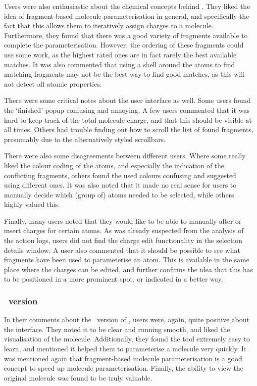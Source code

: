 Users were also enthusiastic about the chemical concepts behind \oframp. They liked the idea of fragment-based molecule parameterisation in general, and specifically the fact that this allows them to iteratively assign charges to a molecule. Furthermore, they found that there was a good variety of fragments available to complete the parameterisation. However, the ordering of these fragments could use some work, as the highest rated ones are in fact rarely the best available matches. It was also commented that using a shell around the atoms to find matching fragments may not be the best way to find good matches, as this will not detect all atomic properties.

There were some critical notes about the user interface as well. Some users found the `finished' popup confusing and annoying. A few users commented that it was hard to keep track of the total molecule charge, and that this should be visible at all times. Others had trouble finding out how to scroll the list of found fragments, presumably due to the alternatively styled scrollbars.

There were also some disagreements between different users. Where some really liked the colour coding of the atoms, and especially the indication of the conflicting fragments, others found the used colours confusing and suggested using different ones. It was also noted that it made no real sense for users to manually decide which (group of) atoms needed to be selected, while others highly valued this.

Finally, many users noted that they would like to be able to manually alter or insert charges for certain atoms. As was already suspected from the analysis of the action logs, users did not find the charge edit functionality in the selection details window. A user also commented that it should be possible to see what fragments have been used to parameterise an atom. This is available in the same place where the charges can be edited, and further confirms the idea that this has to be positioned in a more prominent spot, or indicated in a better way.

\subsubsection{\IDB\ version}
In their comments about the \IDb\ version of \oframp, users were, again, quite positive about the interface. They noted it to be clear and running smooth, and liked the visualisation of the molecule. Additionally, they found the tool extremely easy to learn, and mentioned it helped them to parameterise a molecule very quickly. It was mentioned again that fragment-based molecule parameterisation is a good concept to speed up molecule parameterisation. Finally, the ability to view the original molecule was found to be truly valuable.

